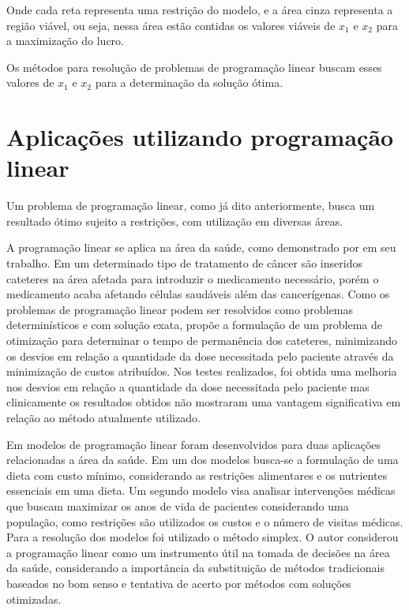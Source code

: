 Onde cada reta representa uma restrição do modelo, e a área cinza representa a região viável, ou seja, nessa área estão contidas os valores viáveis de $x_{1}$ e $x_{2}$ para a maximização do lucro.

Os métodos para resolução de problemas de programação linear buscam esses valores de $x_{1}$ e $x_{2}$  para a determinação da solução ótima.

\section{Aplicações utilizando programação linear}
Um problema de programação linear, como já dito anteriormente, busca um resultado ótimo sujeito a restrições, com utilização em diversas áreas.

A programação linear se aplica na área da saúde, como demonstrado por  em seu trabalho. Em um determinado tipo de tratamento de câncer são inseridos cateteres na área afetada para introduzir o medicamento necessário, porém o medicamento acaba afetando células saudáveis além das cancerígenas. Como os problemas de programação linear podem ser resolvidos como problemas determinísticos e com solução exata,  propõe a formulação de um problema de otimização para determinar o tempo de permanência dos cateteres, minimizando os desvios em relação a quantidade da dose necessitada pelo paciente através da minimização de custos atribuídos. Nos testes realizados, foi obtida uma melhoria nos desvios em relação a quantidade da dose necessitada pelo paciente mas clinicamente os resultados obtidos não mostraram uma vantagem significativa em relação ao método atualmente utilizado.

Em  modelos de programação linear foram desenvolvidos para duas aplicações relacionadas a área da saúde. Em um dos modelos busca-se a formulação de uma dieta com custo mínimo, considerando as restrições alimentares e os nutrientes essenciais em uma dieta. Um segundo modelo visa analisar intervenções médicas que buscam maximizar os anos de vida de pacientes considerando uma população, como restrições são utilizados os custos e o número de visitas médicas. Para a resolução dos modelos foi utilizado o método simplex. O autor considerou a programação linear como um instrumento útil na tomada de decisões na área da saúde, considerando a importância da substituição de métodos tradicionais baseados no bom senso e tentativa de acerto por métodos com soluções otimizadas.

